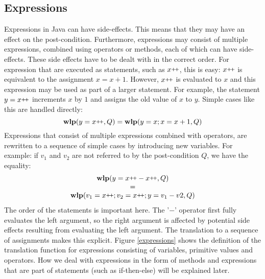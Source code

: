 \documentclass[a4paper, fleqn]{article}
\newcommand{\pp}{\raisebox{.4ex}{\tiny\bf +}\nolinebreak\hspace{-.10em}\raisebox{.4ex}{\tiny\bf +}}
\newcommand{\wlp}{\textbf{wlp}\xspace}
\begin{document}
\subsection{Expressions}
Expressions in Java can have side-effects. This means that they may have an effect on the post-condition. Furthermore, expressions may consist of multiple expressions, combined using operators or methods, each of which can have side-effects. These side effects have to be dealt with in the correct order. For expression that are executed as statements, such as $x\pp$, this is easy: $x\pp$ is equivalent to the assignment $x = x+1$. However, $x\pp$ is evaluated to $x$ and this expression may be used as part of a larger statement. For example, the statement $y = x\pp$ increments $x$ by $1$ and assigns the old value of $x$ to $y$. Simple cases like this are handled directly: \[\wlp(y = x\pp, Q) = \wlp(y = x;x = x+1, Q)\] Expressions that consist of multiple expressions combined with operators, are rewritten to a sequence of simple cases by introducing new variables. For example: if $v_1$ and $v_2$ are not referred to by the post-condition $Q$, we have the equality:
\[\begin{array}{c}
 \wlp(y = x\pp - x\pp, Q)\\
=\\
\wlp(v_1=x\pp;v_2=x\pp;y=v_1-v2, Q)
\end{array}\]
The order of the statements is important here. The '$-$' operator first fully evaluates the left argument, so the right argument is affected by potential side effects resulting from evaluating the left argument. The translation to a sequence of assignments makes this explicit. Figure \ref{expressions} shows the definition of the translation function for expressions consisting of variables, primitive values and operators. How we deal with expressions in the form of methods and expressions that are part of statements (such as if-then-else) will be explained later.
\end{document}
